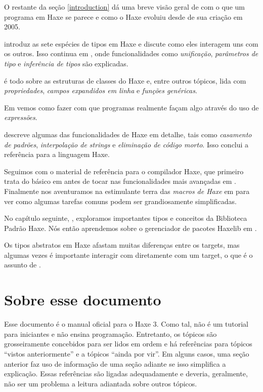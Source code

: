 O restante da seção \ref{introduction} dá uma breve visão geral de com o que um programa em Haxe se parece e como o Haxe evoluiu desde de sua criação em 2005.

 introduz as sete espécies de tipos em Haxe e discute como eles interagem uns com os outros. Isso continua em , onde funcionalidades como \emph{unificação}, \emph{parâmetros de tipo} e \emph{inferência de tipos} são explicadas.

 é todo sobre as estruturas de classes do Haxe e, entre outros tópicos, lida com \emph{propriedades}, \emph{campos expandidos em linha} e \emph{funções genéricas}.

Em  vemos como fazer com que programas realmente façam algo através do uso de \emph{expressões}.

 descreve algumas das funcionalidades de Haxe em detalhe, tais como \emph{casamento de padrões}, \emph{interpolação de strings} e \emph{eliminação de código morto}. Isso conclui a referência para a linguagem Haxe.

Seguimos com o material de  referência para o compilador Haxe, que primeiro trata do básico em  antes de tocar nas funcionalidades mais avançadas em . Finalmente nos aventuramos na estimulante terra das \emph{macros de Haxe} em  para ver como algumas tarefas comuns podem ser grandiosamente simplificadas.

No capítulo seguinte, , exploramos importantes tipos e conceitos da Biblioteca Padrão Haxe. Nós então aprendemos sobre o gerenciador de pacotes Haxelib em .

Os tipos abstratos em Haxe afastam muitas diferenças entre os targets, mas algumas vezes é importante interagir com diretamente com um target, o que é o assunto de .

\section{Sobre esse documento}
\label{introduction-about-this-document}

Esse documento é o manual oficial para o Haxe 3. Como tal, não é um tutorial para iniciantes e não ensina programação. Entretanto, os tópicos são grosseiramente concebidos para ser lidos em ordem e há referências para tópicos ``vistos anteriormente'' e a tópicos ``ainda por vir''. Em alguns casos, uma seção anterior faz uso de informação de uma seção adiante se isso simplifica a explicação. Essas referências são ligadas adequadamente e deveria, geralmente, não ser um problema a leitura adiantada sobre outros tópicos.

